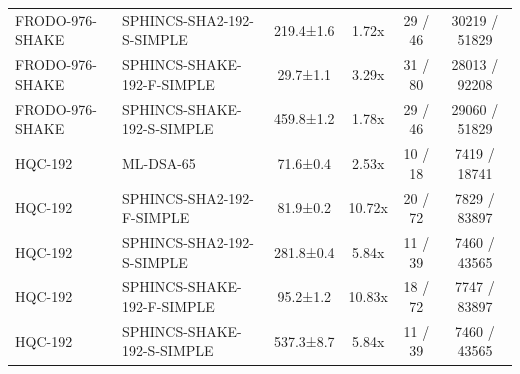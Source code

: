 \documentclass[10pt]{article}
\begin{document}
\begin{tabular}{@{}l l c c c c@{}}
FRODO-976-SHAKE & SPHINCS-SHA2-192-S-SIMPLE & 219.4±1.6 & 1.72x & 29 / 46 & 30219 / 51829 \\
FRODO-976-SHAKE & SPHINCS-SHAKE-192-F-SIMPLE & 29.7±1.1 & 3.29x & 31 / 80 & 28013 / 92208 \\
FRODO-976-SHAKE & SPHINCS-SHAKE-192-S-SIMPLE & 459.8±1.2 & 1.78x & 29 / 46 & 29060 / 51829 \\
HQC-192 & ML-DSA-65 & 71.6±0.4 & 2.53x & 10 / 18 & 7419 / 18741 \\
HQC-192 & SPHINCS-SHA2-192-F-SIMPLE & 81.9±0.2 & 10.72x & 20 / 72 & 7829 / 83897 \\
HQC-192 & SPHINCS-SHA2-192-S-SIMPLE & 281.8±0.4 & 5.84x & 11 / 39 & 7460 / 43565 \\
HQC-192 & SPHINCS-SHAKE-192-F-SIMPLE & 95.2±1.2 & 10.83x & 18 / 72 & 7747 / 83897 \\
HQC-192 & SPHINCS-SHAKE-192-S-SIMPLE & 537.3±8.7 & 5.84x & 11 / 39 & 7460 / 43565 \\
\bottomrule
\end{tabular}
\end{document}
